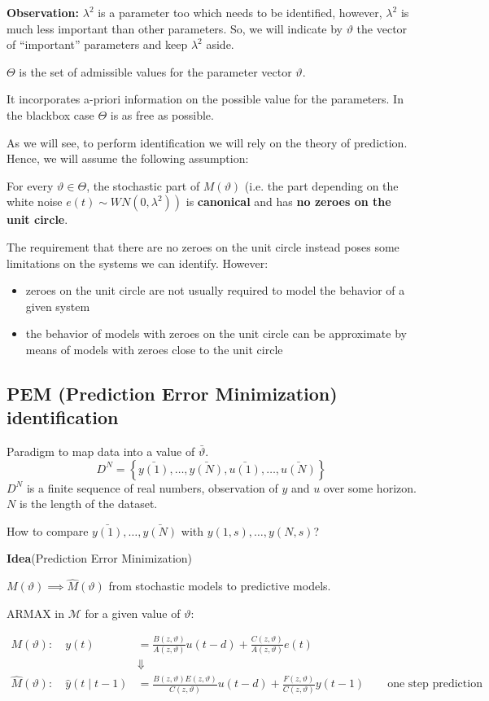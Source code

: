 \textbf{Observation:} $\lambda^2$ is a parameter too which needs to be identified, however, $\lambda^2$ is much less important than other parameters. So, we will indicate by $\vartheta$ the vector of “important” 
parameters and keep $\lambda^2$ aside.

$\Theta$ is the set of admissible values for the parameter vector $\vartheta$.

It incorporates a-priori information on the possible value for the 
parameters. In the blackbox case $\Theta$ is as free as possible.

As we will see, to perform identification we will rely on the theory of 
prediction. Hence, we will assume the following assumption:

For every $\vartheta \in \Theta$, the stochastic part of $M(\vartheta)$ (i.e. the part depending on the white noise $\left.e(t) \sim W N\left(0, \lambda^{2}\right)\right)$ is \textbf{canonical} and has \textbf{no zeroes on the unit circle}.

The requirement that there are no zeroes on the unit circle instead 
poses some limitations on the systems we can identify. However:
\begin{itemize}
	\item zeroes on the unit circle are not usually required to model the 
	behavior of a given system
	\item the behavior of models with zeroes on the unit circle can be 
	approximate by means of models with zeroes close to the unit 
	circle
\end{itemize} 

\subsection{PEM (Prediction Error Minimization) identification}
Paradigm to map data into a value of $\bar{\vartheta}$.
$$
D^N=\left\{\bar{y(1)},\ldots,\bar{y(N)},\bar{u(1)},\ldots,\bar{u(N)}\right\}
$$
$D^N$ is a finite sequence of real numbers, observation of $y$ and $u$ over some horizon. $N$ is the length of the dataset.


How to compare $\bar{y(1)},\ldots,\bar{y(N)}$ with $y(1,s),\ldots,y(N,s)$?


\textbf{Idea}(Prediction Error Minimization)

$M(\vartheta)\implies \hat{M}(\vartheta)$ from stochastic models to predictive models.

ARMAX in $\mathcal{M}$ for a given value of $\vartheta$:

\begin{align*}
	M(\vartheta):\quad y(t)&=\frac{B(z, \vartheta)}{A(z, \vartheta)} u(t-d)+\frac{C(z, \vartheta)}{A(z, \vartheta)} e(t)\\
	&\Downarrow\\
	\hat{M}(\vartheta): \quad \hat{y}(t \mid t-1) &=\frac{B(z,\vartheta) E(z,\vartheta)}{C(z,\vartheta)} u(t-d)+\frac{F(z,\vartheta)}{C(z,\vartheta)} y(t-1) \qquad \text{one step prediction}
\end{align*}



